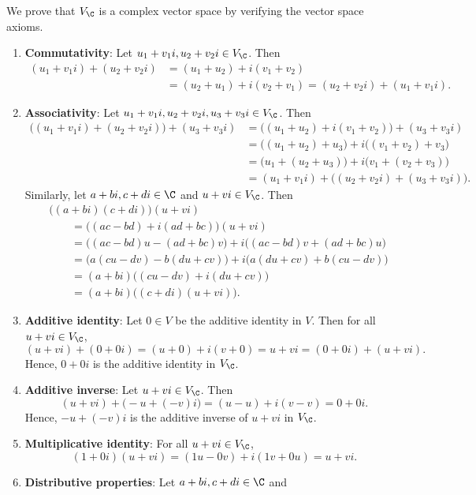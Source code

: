 \begin{solution}
We prove that $V_{\C}$ is a complex vector space by verifying the vector space
axioms.
\begin{enumerate}[label=\arabic*)]
\item \textbf{Commutativity}: Let $u_1+v_1i,u_2+v_2i\in V_{\C}$. Then
  \begin{align*}
  (u_1+v_1i)+(u_2+v_2i) &= (u_1+u_2)+i(v_1+v_2)\\
    &= (u_2+u_1)+i(v_2+v_1) = (u_2+v_2i)+(u_1+v_1i).
  \end{align*}
\item \textbf{Associativity}: Let $u_1+v_1i,u_2+v_2i,u_3+v_3i\in V_{\C}$. Then
  \begin{align*}
  \bigl((u_1+v_1i)+(u_2+v_2i)\bigr)+(u_3+v_3i)
    &= \bigl((u_1+u_2)+i(v_1+v_2)\bigr)+(u_3+v_3i)\\
    &= \bigl((u_1+u_2)+u_3\bigr)+i\bigl((v_1+v_2)+v_3\bigr)\\
    &= \bigl(u_1+(u_2+u_3)\bigr)+i\bigl(v_1+(v_2+v_3)\bigr)\\
    &= (u_1+v_1i)+\bigl((u_2+v_2i)+(u_3+v_3i)\bigr).
  \end{align*}
  Similarly, let $a+bi,c+di\in\C$ and $u+vi\in V_{\C}$. Then
  \begin{align*}
  &\bigl((a+bi)(c+di)\bigr)(u+vi)\\
    &\qquad= \bigl((ac-bd)+i(ad+bc)\bigr)(u+vi)\\
    &\qquad= \bigl((ac-bd)u-(ad+bc)v\bigr)+i\bigl((ac-bd)v+(ad+bc)u\bigr)\\
    &\qquad= \bigl(a(cu-dv)-b(du+cv)\bigr)+i\bigl(a(du+cv)+b(cu-dv)\bigr)\\
    &\qquad= (a+bi)\bigl((cu-dv)+i(du+cv)\bigr)\\
    &\qquad= (a+bi)\bigl((c+di)(u+vi)\bigr).
  \end{align*}
\item \textbf{Additive identity}: Let $0\in V$ be the additive identity in $V$.
  Then for all $u+vi\in V_{\C}$,
  \[ (u+vi)+(0+0i) = (u+0)+i(v+0) = u+vi = (0+0i)+(u+vi). \]
  Hence, $0+0i$ is the additive identity in $V_{\C}$.
\item \textbf{Additive inverse}: Let $u+vi\in V_{\C}$. Then
  \[ (u+vi)+\bigl(-u+(-v)i\bigr) = (u-u)+i(v-v) = 0+0i. \]
  Hence, $-u+(-v)i$ is the additive inverse of $u+vi$ in $V_{\C}$.
\item \textbf{Multiplicative identity}: For all $u+vi\in V_{\C}$,
  \[ (1+0i)(u+vi) = (1u-0v)+i(1v+0u) = u+vi. \]
\item \textbf{Distributive properties}: Let $a+bi,c+di\in\C$ and

\end{enumerate}
\end{solution}
